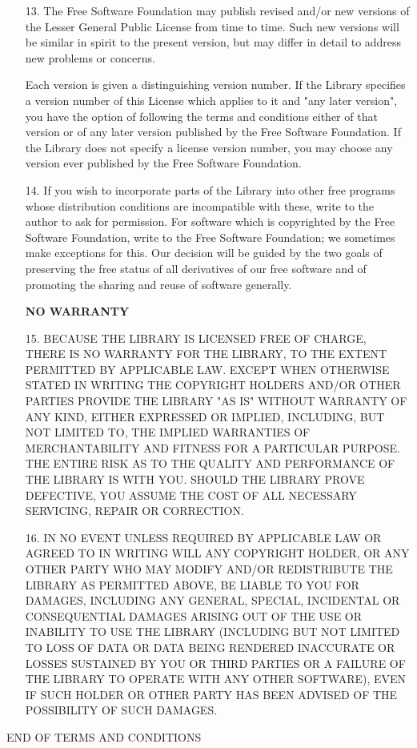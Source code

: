 {\begin{itemize}
\item [13.] The Free Software Foundation may publish revised and/or
  new versions of the Lesser General Public License from time to time.
  Such new versions will be similar in spirit to the present version,
  but may differ in detail to address new problems or concerns.
    
  Each version is given a distinguishing version number.  If the
  Library specifies a version number of this License which applies to
  it and "any later version", you have the option of following the
  terms and conditions either of that version or of any later version
  published by the Free Software Foundation.  If the Library does not
  specify a license version number, you may choose any version ever
  published by the Free Software Foundation.
  
\item [14.] If you wish to incorporate parts of the Library into other
  free programs whose distribution conditions are incompatible with
  these, write to the author to ask for permission.  For software
  which is copyrighted by the Free Software Foundation, write to the
  Free Software Foundation; we sometimes make exceptions for this.
  Our decision will be guided by the two goals of preserving the free
  status of all derivatives of our free software and of promoting the
  sharing and reuse of software generally.
    
\textbf{NO WARRANTY}

\item [15.] BECAUSE THE LIBRARY IS LICENSED FREE OF CHARGE, THERE IS
  NO WARRANTY FOR THE LIBRARY, TO THE EXTENT PERMITTED BY APPLICABLE
  LAW.  EXCEPT WHEN OTHERWISE STATED IN WRITING THE COPYRIGHT HOLDERS
  AND/OR OTHER PARTIES PROVIDE THE LIBRARY "AS IS" WITHOUT WARRANTY OF
  ANY KIND, EITHER EXPRESSED OR IMPLIED, INCLUDING, BUT NOT LIMITED
  TO, THE IMPLIED WARRANTIES OF MERCHANTABILITY AND FITNESS FOR A
  PARTICULAR PURPOSE.  THE ENTIRE RISK AS TO THE QUALITY AND
  PERFORMANCE OF THE LIBRARY IS WITH YOU.  SHOULD THE LIBRARY PROVE
  DEFECTIVE, YOU ASSUME THE COST OF ALL NECESSARY SERVICING, REPAIR OR
  CORRECTION.
    
\item [16.] IN NO EVENT UNLESS REQUIRED BY APPLICABLE LAW OR AGREED TO
  IN WRITING WILL ANY COPYRIGHT HOLDER, OR ANY OTHER PARTY WHO MAY
  MODIFY AND/OR REDISTRIBUTE THE LIBRARY AS PERMITTED ABOVE, BE LIABLE
  TO YOU FOR DAMAGES, INCLUDING ANY GENERAL, SPECIAL, INCIDENTAL OR
  CONSEQUENTIAL DAMAGES ARISING OUT OF THE USE OR INABILITY TO USE THE
  LIBRARY (INCLUDING BUT NOT LIMITED TO LOSS OF DATA OR DATA BEING
  RENDERED INACCURATE OR LOSSES SUSTAINED BY YOU OR THIRD PARTIES OR A
  FAILURE OF THE LIBRARY TO OPERATE WITH ANY OTHER SOFTWARE), EVEN IF
  SUCH HOLDER OR OTHER PARTY HAS BEEN ADVISED OF THE POSSIBILITY OF
  SUCH DAMAGES.
\end{itemize}

END OF TERMS AND CONDITIONS

}

